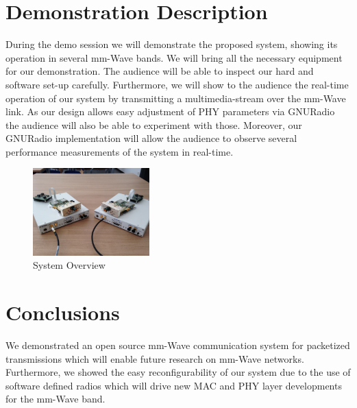 \documentclass{acm_proc_article-sp}
\begin{document}
\section{Demonstration Description} 
During the demo session we will demonstrate the proposed system, showing its operation in several mm-Wave bands. We will bring all the necessary equipment for our demonstration. The audience will be able to inspect our hard and software set-up carefully. Furthermore, we will show to the audience the real-time operation of our system by transmitting a multimedia-stream over the mm-Wave link. As our design allows easy adjustment of PHY parameters via GNURadio the audience will also be able to experiment with those. Moreover, our GNURadio implementation will allow the audience to observe several performance measurements of the system in real-time.

\begin{figure}
\center
\includegraphics[width=0.4\textwidth]{system}
\caption{System Overview}
\label{fig:system}
\end{figure}

\section{Conclusions}
We demonstrated an open source mm-Wave communication system for packetized transmissions which will enable future research on mm-Wave networks. Furthermore, we showed the easy reconfigurability of our system due to the use of software defined radios which will drive new MAC and PHY layer developments for the mm-Wave band.
\balancecolumns



\balancecolumns
\end{document}
